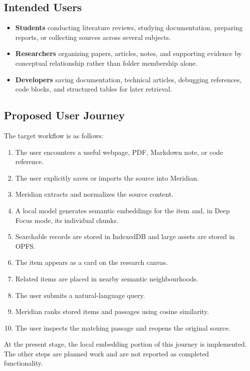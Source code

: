 \documentclass{tietreport}
\begin{document}
\subsection{Intended Users}

\begin{itemize}
  \item \textbf{Students} conducting literature reviews, studying documentation, preparing
    reports, or collecting sources across several subjects.
  \item \textbf{Researchers} organizing papers, articles, notes, and supporting evidence by
    conceptual relationship rather than folder membership alone.
  \item \textbf{Developers} saving documentation, technical articles, debugging references,
    code blocks, and structured tables for later retrieval.
\end{itemize}

\subsection{Proposed User Journey}

The target workflow is as follows:

\begin{enumerate}
  \item The user encounters a useful webpage, PDF, Markdown note, or code reference.
  \item The user explicitly saves or imports the source into Meridian.
  \item Meridian extracts and normalizes the source content.
  \item A local model generates semantic embeddings for the item and, in Deep Focus mode,
    its individual chunks.
  \item Searchable records are stored in IndexedDB and large assets are stored in OPFS.
  \item The item appears as a card on the research canvas.
  \item Related items are placed in nearby semantic neighbourhoods.
  \item The user submits a natural-language query.
  \item Meridian ranks stored items and passages using cosine similarity.
  \item The user inspects the matching passage and reopens the original source.
\end{enumerate}

At the present stage, the local embedding portion of this journey is implemented. The other
steps are planned work and are not reported as completed functionality.
\end{document}
